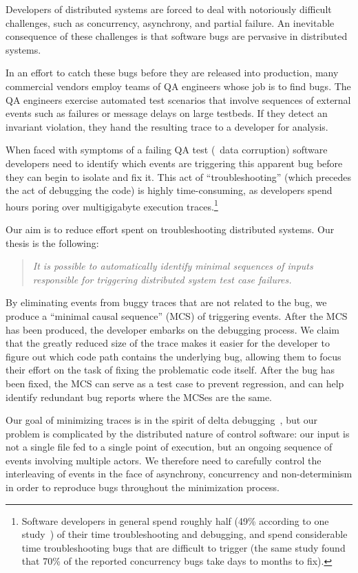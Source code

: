 Developers of distributed systems are forced to deal with
notoriously difficult challenges, such as concurrency, asynchrony, and
partial failure. An inevitable consequence of these challenges is that software
bugs are pervasive in distributed systems.

In an effort to catch these bugs
before they are released into production, many commercial vendors employ
teams of QA engineers whose
job is to find bugs. The QA engineers exercise automated test scenarios that involve
sequences of external events such as failures or message delays
on large testbeds.
If they detect an invariant violation, they hand the resulting trace to a developer for analysis.

When faced with symptoms of a failing QA test (\eg~data
corruption) software developers need to identify which events are triggering
this apparent bug before they can begin to isolate and fix it.
This act of ``troubleshooting'' (which precedes the act of debugging the
code) is highly time-consuming, as developers spend hours poring
over multigigabyte execution traces.\footnote{Software developers in general spend roughly half (49\% according to one
study~\cite{msoft_concurrency}) of their time troubleshooting and debugging, and spend
considerable time troubleshooting bugs that are difficult to trigger (the same study found
that 70\% of the reported concurrency bugs take days to months to fix).}

Our aim is to reduce effort spent on troubleshooting distributed systems.
Our thesis is the following:
\begin{quote}
{\it
It is possible to
automatically identify minimal sequences of inputs
responsible for triggering
distributed system test case failures.
}
\end{quote}
By eliminating events from buggy traces that are not related to the
bug, we produce a ``minimal
causal sequence'' (MCS) of triggering events. After the MCS has been produced, the developer embarks
on the debugging process. We claim that the greatly reduced size of the
trace makes it easier for the developer to figure out which code path contains
the underlying bug, allowing them to focus their effort on
the task of fixing the problematic code itself. After the bug has been fixed, the MCS
can serve as a test case to prevent regression,
and can help identify redundant bug reports where the MCSes are the same.

Our goal of minimizing traces is in the spirit of
delta debugging~\cite{Zeller:1999:YMP:318773.318946}, but our problem is
complicated by the distributed nature of control software:
our input is not a single file fed to a single point of execution, but an ongoing
sequence of events involving
multiple actors. We therefore need to carefully
control the interleaving of events in the face of asynchrony, concurrency and non-determinism in
order to reproduce bugs throughout the minimization process.

